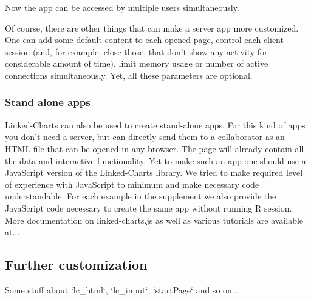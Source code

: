 \documentclass[twocolumn,10pt]{article}
\begin{document}
Now the app can be accessed by multiple users simultaneously.

Of course, there are other things that can make a server app more customized. One can add some default content to each opened page, control each client session (and, for example, close those, that don't show any activity for considerable amount of time), limit memory usage or number of active connections simultaneously. Yet, all these parameters are optional.

\subsubsection{Stand alone apps}
Linked-Charts can also be used to create stand-alone apps. For this kind of apps you don't need a server, but can directly send them to a collaborator as an HTML file that can be opened in any browser. The page will already contain all the data and interactive functionality. Yet to make such an app one should use a JavaScript version of the Linked-Charts library. We tried to make required level of experience with JavaScript to minimum and make necessary code understandable. For each example in the supplement we also provide the JavaScript code necessary to create the same app without running R session. More documentation on linked-charts.js as well as various tutorials are available at...

\subsection{Further customization}
Some stuff about `lc_html`, `lc_input`, `startPage` and so on...
\end{document}
